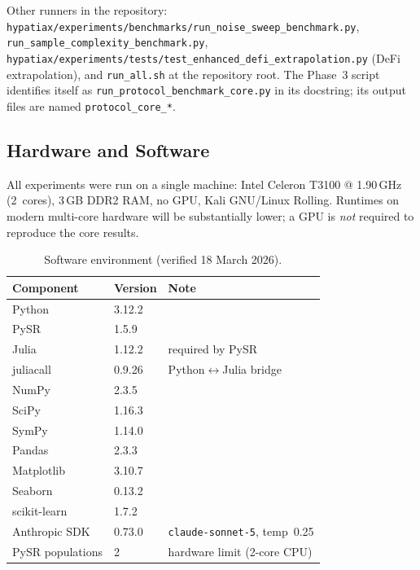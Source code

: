 \documentclass[twoside,11pt]{article}
\begin{document}
\noindent Other runners in the repository: \texttt{hypatiax/experiments/benchmarks/run\_noise\_sweep\_benchmark.py},
\texttt{run\_sample\_complexity\_benchmark.py}, \texttt{hypatiax/experiments/tests/test\_enhanced\_defi\_extrapolation.py}
(DeFi extrapolation), and \texttt{run\_all.sh} at the repository root. The Phase~3 script identifies itself as
\texttt{run\_protocol\_benchmark\_core.py} in its docstring; its output files are named \texttt{protocol\_core\_*}.


\subsection{Hardware and Software}

All experiments were run on a single machine: Intel Celeron T3100 @
1.90\,GHz (2~cores), 3\,GB DDR2 RAM, no GPU, Kali GNU/Linux Rolling.
Runtimes on modern multi-core hardware will be substantially lower; a GPU
is \emph{not} required to reproduce the core results.

\begin{table}[H]
\centering
\caption{Software environment (verified 18 March 2026).}
\label{tab:runtime_reproducibility}
\small
\begin{tabular}{@{}lll@{}}
\toprule
\textbf{Component} & \textbf{Version} & \textbf{Note} \\
\midrule
Python       & 3.12.2  & \\
PySR         & 1.5.9   & \\
Julia        & 1.12.2  & required by PySR \\
juliacall    & 0.9.26  & Python$\leftrightarrow$Julia bridge \\
NumPy        & 2.3.5   & \\
SciPy        & 1.16.3  & \\
SymPy        & 1.14.0  & \\
Pandas       & 2.3.3   & \\
Matplotlib   & 3.10.7  & \\
Seaborn      & 0.13.2  & \\
scikit-learn & 1.7.2   & \\
Anthropic SDK & 0.73.0 & \texttt{claude-sonnet-5}, temp~0.25 \\
\midrule
PySR populations & 2 & hardware limit (2-core CPU) \\
\bottomrule
\end{tabular}
\end{table}
\end{document}
